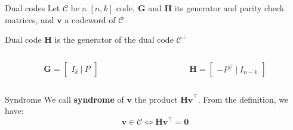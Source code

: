 \begin{frame}{Dual codes}
    Let $\mathcal{C}$ be a $[n, k]$ code, $\mathbf{G}$ and $\mathbf{H}$ its generator and parity check matrices, and $\mathbf{v}$ a codeword of $\mathcal{C}$
        \begin{block}{Dual code}
            $\mathbf{H}$ is the generator of the dual code $\mathcal{C}^\bot$
            \begin{columns}
                \begin{column}{0.45\linewidth}
                    \begin{equation*}
                        \mathbf{G} = \begin{bmatrix} I_k ~|~ P \end{bmatrix}
                    \end{equation*}
                \end{column}
                \begin{column}{0.45\linewidth}
                    \begin{equation*}
                        \mathbf{H} = \begin{bmatrix} -P^\top ~|~ I_{n-k} \end{bmatrix}
                    \end{equation*}
                \end{column}
            \end{columns}
        \end{block}
        \begin{block}{Syndrome}
            We call \textbf{syndrome} of $\mathbf{v}$ the product $\mathbf{Hv}^\top$. From the definition, we have:
            \begin{equation*}
                \mathbf{v} \in \mathcal{C} \Leftrightarrow \mathbf{Hv}^\top = \mathbf{0}
            \end{equation*}
        \end{block}
\end{frame}

